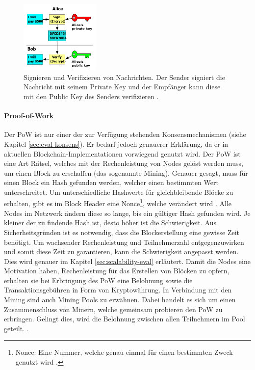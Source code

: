 \begin{figure}[!htbp]
	\centering
	  \includegraphics[width=0.35\textwidth,angle=0]{images/key-signing}
	  \caption{Signieren und Verifizieren von Nachrichten. Der Sender signiert die Nachricht mit seinem Private Key und der Empfänger kann diese mit den Public Key des Senders verifizieren \cite{WikimediaCommonsPublickeysigning2006}.}
	  \label{fig:key-signing}
\end{figure}
	
\paragraph{Proof-of-Work}
Der \acs{PoW} ist nur einer der zur Verfügung stehenden Konsensmechanismen (siehe Kapitel \ref{sec:eval-konsens}). Er bedarf jedoch genauerer Erklärung, da er in aktuellen Blockchain-Implementationen vorwiegend genutzt wird. Der \acs{PoW} ist eine Art Rätsel, welches mit der Rechenleistung von Nodes gelöst werden muss, um einen Block zu erschaffen (das sogenannte Mining). Genauer gesagt, muss für einen Block ein Hash gefunden werden, welcher einen bestimmten Wert unterschreitet. Um unterschiedliche Hashwerte für gleichbleibende Blöcke zu erhalten, gibt es im Block Header eine Nonce\footnote{Nonce: Eine Nummer, welche genau einmal für einen bestimmten Zweck genutzt wird \cite{MargaretNonceDefinition}.}, welche verändert wird \cite{NakamotoBitcoinPeertoPeerElectronic2008}. Alle Nodes im Netzwerk ändern diese so lange, bis ein gültiger Hash gefunden wird. Je kleiner der zu findende Hash ist, desto höher ist die Schwierigkeit. Aus Sicherheitsgründen ist es notwendig, dass die Blockerstellung eine gewisse Zeit benötigt. Um wachsender Rechenleistung und Teilnehmerzahl entgegenzuwirken und somit diese Zeit zu garantieren, kann die Schwierigkeit angepasst werden. Dies wird genauer im Kapitel \ref{sec:scalability-eval} erläutert. Damit die Nodes eine Motivation haben, Rechenleistung für das Erstellen von Blöcken zu opfern, erhalten sie bei Erbringung des \acs{PoW} eine Belohnung sowie die Transaktionsgebühren in Form von Kryptowährung. In Verbindung mit den Mining sind auch Mining Pools zu erwähnen. Dabei handelt es sich um einen Zusammenschluss von Minern, welche gemeinsam probieren den \acs{PoW} zu erbringen. Gelingt dies, wird die Belohnung zwischen allen Teilnehmern im Pool geteilt.  \cite{NakamotoBitcoinPeertoPeerElectronic2008} \cite{EthereumTeamEthereumWhitePaper2017}. 

